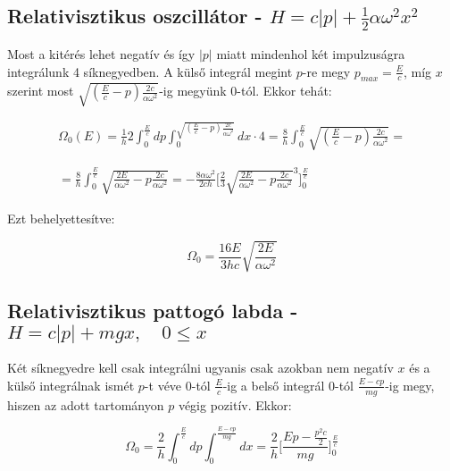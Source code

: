 \documentclass[a4paper,12pt]{article}
\begin{document}
\subsection{Relativisztikus oszcillátor - $H = c|p| + \frac{1}{2}\alpha\omega^{2}x^{2}$}

\par Most a kitérés lehet negatív és így $|p|$ miatt mindenhol két impulzuságra integrálunk 4 síknegyedben. A külső integrál megint $p$-re megy $p_{max} = \frac{E}{c}$, míg $x$ szerint most $\sqrt{(\frac{E}{c} - p)\frac{2c}{\alpha\omega^{2}}}$-ig megyünk $0$-tól. Ekkor tehát:

\begin{equation*}
\begin{gathered}
\Omega_{0}(E) = \frac{1}{h}2\int_{0}^{\frac{E}{c}}dp\int_{0}^{\sqrt{(\frac{E}{c} - p)\frac{2c}{\alpha\omega^{2}}}}dx\cdot4 = \frac{8}{h}\int_{0}^{\frac{E}{c}}\sqrt{(\frac{E}{c} - p)\frac{2c}{\alpha\omega^{2}}} = \\ \\ \\
= \frac{8}{h}\int_{0}^{\frac{E}{c}}\sqrt{\frac{2E}{\alpha\omega^{2}} - p\frac{2c}{\alpha\omega^{2}}} = - \frac{8\alpha\omega^{2}}{2ch} \Big[\frac{2}{3}\sqrt{\frac{2E}{\alpha\omega^{2}} - p\frac{2c}{\alpha\omega^{2}}}^{3}\Big]_{0}^{\frac{E}{c}}
\end{gathered}
\end{equation*}

\par Ezt behelyettesítve:

\begin{equation}
\Omega_{0} = \frac{16E}{3hc}\sqrt{\frac{2E}{\alpha\omega^{2}}}
\end{equation}

\subsection{Relativisztikus pattogó labda - $H = c|p| + mgx, \quad 0 \leq x$}

\par Két síknegyedre kell csak integrálni ugyanis csak azokban nem negatív $x$ és a külső integrálnak ismét $p$-t véve $0$-tól $\frac{E}{c}$-ig a belső integrál $0$-tól $\frac{E - cp}{mg}$-ig megy, hiszen az adott tartományon $p$ végig pozitív. Ekkor:

\begin{equation*}
\Omega_0 = \frac{2}{h}\int_{0}^{\frac{E}{c}}dp\int_{0}^{\frac{E - cp}{mg}}dx = \frac{2}{h}\Big[\frac{Ep - \frac{p^{2}c}{2}}{mg}\Big]_{0}^{\frac{E}{c}}
\end{equation*}
\end{document}

